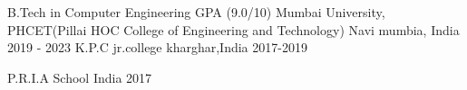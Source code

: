 

\begin{cventries}


{\cventry
    {B.Tech in Computer Engineering GPA (9.0/10)} %
    {Mumbai University, PHCET(Pillai HOC College of Engineering and Technology)} %
    {Navi mumbia, India} %
    {2019 - 2023} %
    {}{\textit{}}{}%
 } 
{%
       {K.P.C jr.college}%
       {kharghar,India}%
       {2017-2019} %
       {}{\textit{}}{}%
 } 
    
{%
       {P.R.I.A School}%
       {India}%
       {2017} %
       {}{\textit{}}{}%
 } 
\end{cventries}
